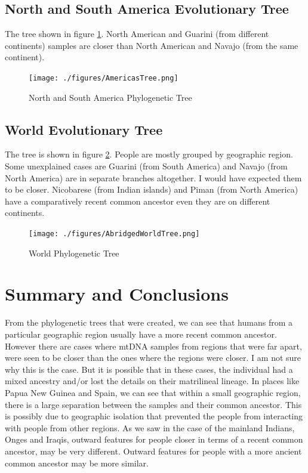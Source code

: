 \documentclass[conference]{IEEEtran}
\begin{document}
\FloatBarrier
\subsection{North and South America Evolutionary Tree}

The tree shown in figure \ref{AmericasTree}. North American and Guarini (from different continents) samples are closer than North American and Navajo (from the same continent).

\begin{figure}[!t]
\centering
\texttt{[image: ./figures/AmericasTree.png]}
\caption{North and South America Phylogenetic Tree}
\label{AmericasTree}
\end{figure}

\FloatBarrier
\subsection{World Evolutionary Tree}

The tree is shown in figure \ref{AbridgedWorldTree}. People are mostly grouped by geographic region. Some unexplained cases are Guarini (from South America) and Navajo (from North America) are in separate branches altogether. I would have expected them to be closer. Nicobarese (from Indian islands) and Piman (from North America) have a comparatively recent common ancestor even they are on different continents.

\begin{figure}[!t]
\centering
\texttt{[image: ./figures/AbridgedWorldTree.png]}
\caption{World Phylogenetic Tree}
\label{AbridgedWorldTree}
\end{figure}

\FloatBarrier
\section{Summary and Conclusions}
From the phylogenetic trees that were created, we can see that humans from a particular geographic region usually have a more recent common ancestor. However there are cases where mtDNA samples from regions that were far apart, were seen to be closer than the ones where the regions were closer. I am not sure why this is the case. But it is possible that in these cases, the individual had a mixed ancestry and/or lost the details on their matrilineal lineage. In places like Papua New Guinea and Spain, we can see that within a small geographic region, there is a large separation between the samples and their common ancestor. This is possibly due to geographic isolation that prevented the people from interacting with people from other regions. As we saw in the case of the mainland Indians, Onges and Iraqis, outward features for people closer in terms of a recent common ancestor, may be very different. Outward features for people with a more ancient common ancestor may be more similar. \\
\end{document}
